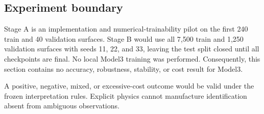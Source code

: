 \subsection{Experiment boundary}
Stage A is an implementation and numerical-trainability pilot on the first 240 train
and 40 validation surfaces. Stage B would use all 7{,}500 train and 1{,}250 validation
surfaces with seeds 11, 22, and 33, leaving the test split closed until all checkpoints
are final. No local Model3 training was performed. Consequently, this section contains
no accuracy, robustness, stability, or cost result for Model3.

A positive, negative, mixed, or excessive-cost outcome would be valid under the frozen
interpretation rules. Explicit physics cannot manufacture identification absent from
ambiguous observations.

